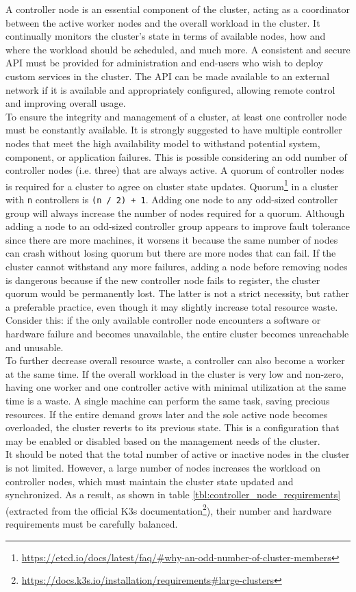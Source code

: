 A controller node is an essential component of the cluster, acting as a coordinator
between the active worker nodes and the overall workload in the cluster. It
continually monitors the cluster's state in terms of available nodes, how and where
the workload should be scheduled, and much more. A consistent and secure API must
be provided for administration and end-users who wish to deploy custom services in
the cluster. The API can be made available to an external network if it is
available and appropriately configured, allowing remote control and improving overall
usage. \\ %
To ensure the integrity and management of a cluster, at least one controller
node must be constantly available. It is strongly suggested to have multiple controller
nodes that meet the high availability model to withstand potential system,
component, or application failures. This is possible considering an odd number
of controller nodes (i.e. three) that are always active. A quorum of controller
nodes is required for a cluster to agree on cluster state updates. Quorum\footnote{\url{https://etcd.io/docs/latest/faq/\#why-an-odd-number-of-cluster-members}}
in a cluster with \texttt{n} controllers is \texttt{(n / 2) + 1}. Adding one
node to any odd-sized controller group will always increase the number of nodes
required for a quorum. Although adding a node to an odd-sized controller group appears
to improve fault tolerance since there are more machines, it worsens it because
the same number of nodes can crash without losing quorum but there are more
nodes that can fail. If the cluster cannot withstand any more failures, adding a
node before removing nodes is dangerous because if the new controller node fails
to register, the cluster quorum would be permanently lost. The latter is not a
strict necessity, but rather a preferable practice, even though it may slightly
increase total resource waste. Consider this: if the only available controller
node encounters a software or hardware failure and becomes unavailable, the entire
cluster becomes unreachable and unusable.\\ %
To further decrease overall resource waste, a controller can also become a worker
at the same time. If the overall workload in the cluster is very low and non-zero,
having one worker and one controller active with minimal utilization at the same
time is a waste. A single machine can perform the same task, saving precious resources.
If the entire demand grows later and the sole active node becomes overloaded, the
cluster reverts to its previous state. This is a configuration that may be
enabled or disabled based on the management needs of the cluster. \\ %
It should be noted that the total number of active or inactive nodes in the
cluster is not limited. However, a large number of nodes increases the workload
on controller nodes, which must maintain the cluster state updated and synchronized.
As a result, as shown in table \ref{tbl:controller_node_requirements} (extracted
from the official K3s documentation\footnote{\url{https://docs.k3s.io/installation/requirements\#large-clusters}}),
their number and hardware requirements must be carefully balanced.


